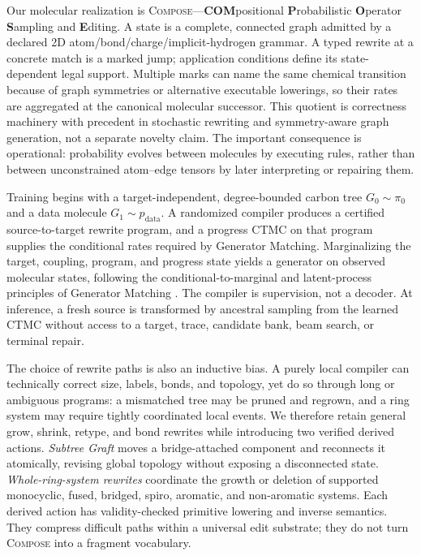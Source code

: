 \documentclass{article}
\newcommand{\method}{\textsc{Compose}\xspace}
\newcommand{\pdata}{p_{\mathrm{data}}}
\newcommand{\pzero}{\pi_0}
\theoremstyle{definition}
\theoremstyle{remark}
\begin{document}
Our molecular realization is \method---\textbf{COM}positional \textbf{P}robabilistic \textbf{O}perator \textbf{S}ampling and \textbf{E}diting. A state is a complete, connected graph admitted by a declared 2D atom/bond/charge/implicit-hydrogen grammar. A typed rewrite at a concrete match is a marked jump; application conditions define its state-dependent legal support. Multiple marks can name the same chemical transition because of graph symmetries or alternative executable lowerings, so their rates are aggregated at the canonical molecular successor. This quotient is correctness machinery with precedent in stochastic rewriting and symmetry-aware graph generation, not a separate novelty claim. The important consequence is operational: probability evolves between molecules by executing rules, rather than between unconstrained atom--edge tensors by later interpreting or repairing them.

Training begins with a target-independent, degree-bounded carbon tree $G_0\sim\pzero$ and a data molecule $G_1\sim\pdata$. A randomized compiler produces a certified source-to-target rewrite program, and a progress CTMC on that program supplies the conditional rates required by Generator Matching. Marginalizing the target, coupling, program, and progress state yields a generator on observed molecular states, following the conditional-to-marginal and latent-process principles of Generator Matching \citep{holderrieth2025generator,billera2026latent}. The compiler is supervision, not a decoder. At inference, a fresh source is transformed by ancestral sampling from the learned CTMC without access to a target, trace, candidate bank, beam search, or terminal repair.

The choice of rewrite paths is also an inductive bias. A purely local compiler can technically correct size, labels, bonds, and topology, yet do so through long or ambiguous programs: a mismatched tree may be pruned and regrown, and a ring system may require tightly coordinated local events. We therefore retain general grow, shrink, retype, and bond rewrites while introducing two verified derived actions. \emph{Subtree Graft} moves a bridge-attached component and reconnects it atomically, revising global topology without exposing a disconnected state. \emph{Whole-ring-system rewrites} coordinate the growth or deletion of supported monocyclic, fused, bridged, spiro, aromatic, and non-aromatic systems. Each derived action has validity-checked primitive lowering and inverse semantics. They compress difficult paths within a universal edit substrate; they do not turn \method into a fragment vocabulary.
\end{document}
